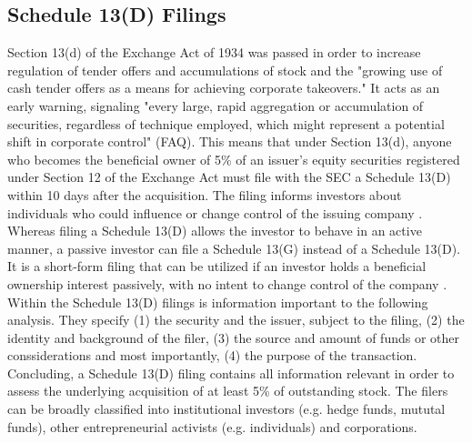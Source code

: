 \documentclass[12pt]{article}
\begin{document}
\subsection{Schedule 13(D) Filings}
Section 13(d) of the Exchange Act of 1934 was passed in order to increase regulation of tender offers and accumulations of stock and the "growing use of cash tender offers as a means for achieving corporate takeovers."  
It acts as an early warning, signaling "every large, rapid aggregation or accumulation of securities, regardless of technique employed, which might represent a potential shift in corporate control" (FAQ). 
This means that under Section 13(d), anyone who becomes the beneficial owner of 5\% of an issuer's equity securities registered under Section 12 of the Exchange Act must file with the SEC a Schedule 13(D) within 10 days after the acquisition. The filing informs investors about individuals who could influence or change control of the issuing company \citep{Giglia2018}. Whereas filing a Schedule 13(D) allows the investor to behave in an active manner, a passive investor can file a Schedule 13(G) instead of a Schedule 13(D). It is a short-form filing that can be utilized if an investor holds a beneficial ownership interest passively, with no intent to change control of the company \citep{Giglia2018}. Within the Schedule 13(D) filings is information important to the following analysis. They specify (1) the security and the issuer, subject to the filing, (2) the identity and background of the filer, (3) the source and amount of funds or other conssiderations and most importantly, (4) the purpose of the transaction. Concluding, a Schedule 13(D) filing contains all information relevant in order to assess the underlying acquisition of at least 5\% of outstanding stock. The filers can be broadly classified into institutional investors (e.g. hedge funds, mututal funds), other entrepreneurial activists (e.g. individuals) \citep{Klein2009} and corporations. 
\end{document}

